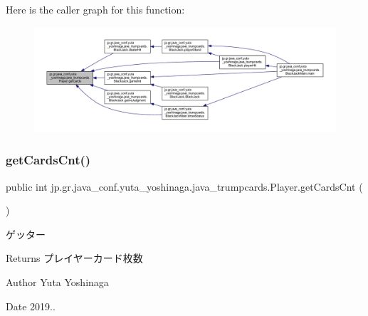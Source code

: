 Here is the caller graph for this function\+:
\nopagebreak
\begin{figure}[H]
\begin{center}
\leavevmode
\includegraphics[width=350pt]{classjp_1_1gr_1_1java__conf_1_1yuta__yoshinaga_1_1java__trumpcards_1_1_player_a6fa54bc94ad8959fbf76abb1107c7385_icgraph}
\end{center}
\end{figure}
\mbox{\label{classjp_1_1gr_1_1java__conf_1_1yuta__yoshinaga_1_1java__trumpcards_1_1_player_ae905e0de5c47509076823375e6995806}} 
\subsubsection{\texorpdfstring{get\+Cards\+Cnt()}{getCardsCnt()}}
{\footnotesize\ttfamily public int jp.\+gr.\+java\+\_\+conf.\+yuta\+\_\+yoshinaga.\+java\+\_\+trumpcards.\+Player.\+get\+Cards\+Cnt (\begin{DoxyParamCaption}{ }\end{DoxyParamCaption})}



ゲッター 

\begin{DoxyReturn}{Returns}
プレイヤーカード枚数 
\end{DoxyReturn}
\begin{DoxyAuthor}{Author}
Yuta Yoshinaga 
\end{DoxyAuthor}
\begin{DoxyDate}{Date}
2019.. 
\end{DoxyDate}


